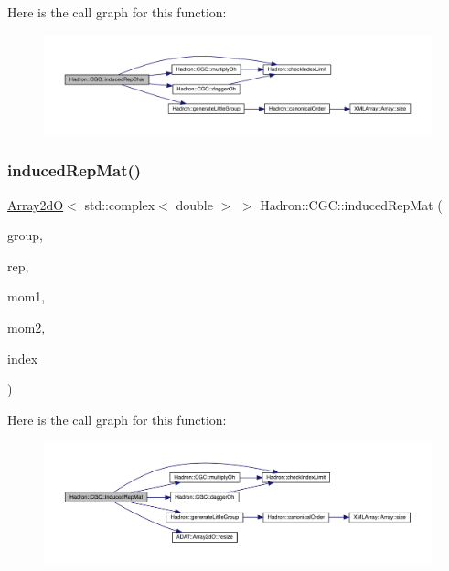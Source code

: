 Here is the call graph for this function\+:\nopagebreak
\begin{figure}[H]
\begin{center}
\leavevmode
\includegraphics[width=350pt]{d9/d19/namespaceHadron_1_1CGC_a6508b0e362ceb9df82bdd26575736fc6_cgraph}
\end{center}
\end{figure}
\mbox{\label{namespaceHadron_1_1CGC_aa7e28e013e98896d3053e95ce419f31e}} 
\subsubsection{\texorpdfstring{inducedRepMat()}{inducedRepMat()}}
{\footnotesize\ttfamily \mbox{\hyperlink{classADAT_1_1Array2dO}{Array2dO}}$<$ std\+::complex$<$ double $>$ $>$ Hadron\+::\+C\+G\+C\+::induced\+Rep\+Mat (\begin{DoxyParamCaption}\item[{\mbox{\hyperlink{classADAT_1_1Handle}{Handle}}$<$ \mbox{\hyperlink{structHadron_1_1LatticeGroup}{Lattice\+Group}} $>$}]{group,  }\item[{\mbox{\hyperlink{classADAT_1_1Handle}{Handle}}$<$ \mbox{\hyperlink{structHadron_1_1CubicRep}{Cubic\+Rep}} $>$}]{rep,  }\item[{const Array\+Int \&}]{mom1,  }\item[{const Array\+Int \&}]{mom2,  }\item[{int}]{index }\end{DoxyParamCaption})}

Here is the call graph for this function\+:\nopagebreak
\begin{figure}[H]
\begin{center}
\leavevmode
\includegraphics[width=350pt]{d9/d19/namespaceHadron_1_1CGC_aa7e28e013e98896d3053e95ce419f31e_cgraph}
\end{center}
\end{figure}
\mbox{\label{namespaceHadron_1_1CGC_a16432200edf54430116d5593f2f755d6}} 

